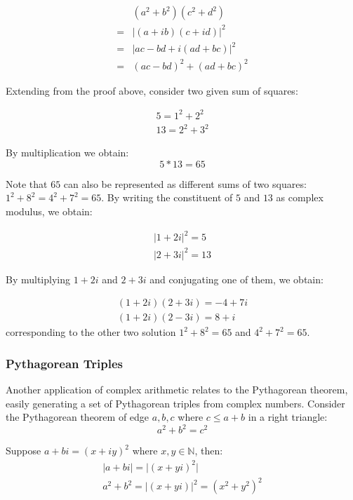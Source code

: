 \documentclass[12pt]{article}
\begin{document}
	\begin{align*}
		  & (a^2 + b^2)(c^2 + d^2) \\
		= & \lvert (a + ib)(c + id) \rvert ^2 \\
		= & \lvert ac - bd + i(ad + bc) \rvert ^2 \\
		= & (ac - bd)^2 + (ad + bc)^2
	\end{align*}
	 
	Extending from the proof above, consider two given sum of squares:
	
	\begin{gather*}
		5 = 1^2 + 2^2 \\
		13 = 2^2 + 3^2
	\end{gather*}
	
	By multiplication we obtain: $$5 * 13 = 65$$
	
	Note that $65$ can also be represented as different sums of two squares: $1^2 + 8^2 = 4^2 + 7^2 = 65$. By writing the constituent of $5$ and $13$ as complex modulus, we obtain:
	
	\begin{gather*}
		\lvert 1 + 2i \rvert ^2 = 5 \\
		\lvert 2 + 3i \rvert ^ 2 = 13
	\end{gather*}
	
	By multiplying $1 + 2i$ and $2 + 3i$ and conjugating one of them, we obtain:
	
	\begin{gather*}
		(1 + 2i)(2 + 3i) = -4 + 7i \\
		(1 + 2i)(2 - 3i) = 8 + i
	\end{gather*}
	corresponding to the other two solution $1^2 + 8^2 = 65$ and $4^2 + 7^2 = 65$.
	
	\subsubsection{Pythagorean Triples}
	
	Another application of complex arithmetic relates to the Pythagorean theorem, easily generating a set of Pythagorean triples from complex numbers. Consider the Pythagorean theorem of edge $a, b, c$ where $c \leq a + b$ in a right triangle: $$a^2 + b^2 = c^2$$
	
	Suppose $a + bi = (x + iy) ^2$ where $x, y \in \mathbb{N}$, then:
	\begin{gather*}
		\lvert a + bi \rvert = \lvert (x + yi)^2 \rvert \\
		a^2 + b^2 = \lvert (x + yi) \rvert ^2 = (x^2 + y^2)^2
	\end{gather*}
	
\end{document}
